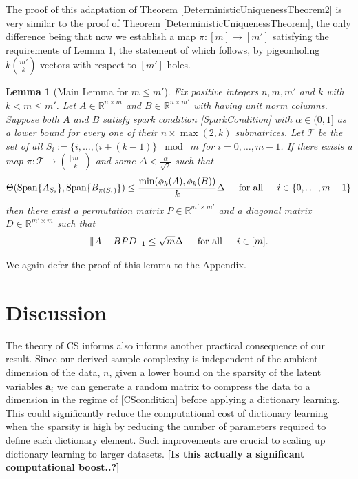 \documentclass[journal, onecolumn]{IEEEtran}
\newtheorem{lemma}{Lemma}
\begin{document}
The proof of this adaptation of Theorem \ref{DeterministicUniquenessTheorem2} is very similar to the proof of Theorem \ref{DeterministicUniquenessTheorem}, the only difference being that now we establish a map $\pi: [m] \to [m']$ satisfying the requirements of Lemma \ref{MainLemma2}, the statement of which follows, by pigeonholing $k{m' \choose k}$ vectors with respect to $[m']$ holes.

\begin{lemma}[Main Lemma for $m \leq m'$]\label{MainLemma2}
Fix positive integers $n, m, m'$ and $k$ with $k < m \leq m'$. Let $A \in \mathbb{R}^{n \times m}$ and $B \in \mathbb{R}^{n \times m'}$ with having unit norm columns. Suppose both $A$ and $B$ satisfy spark condition \eqref{SparkCondition} with $\alpha \in (0,1]$ as a lower bound for every one of their $n \times \max(2,k)$ submatrices. Let $\mathcal{T}$ be the set of all $S_i := \{i, \ldots, (i + (k-1) \} \;\bmod\; m$ for $i = 0, \ldots, m-1$. If there exists a map $\pi: \mathcal{T} \to {[m] \choose k}$ and some $\Delta < \frac{\alpha}{\sqrt{2}}$ such that 
\begin{equation}\label{GapUpperBound2}
\Theta(\text{Span}\{A_{S_i}\}, \text{Span}\{B_{\pi(S_i)}\}) \leq \frac{ \min(\phi_k(A), \phi_k(B)) }{k} \Delta \indent \text{for all} \indent i \in \{0, \ldots, m-1\}
\end{equation}
%
then there exist a permutation matrix $P \in \mathbb{R}^{m' \times m'}$ and a diagonal matrix $D \in \mathbb{R}^{m' \times m}$ such that
\begin{align}
\|A - BPD\|_1 \leq \sqrt{m}\Delta \indent \text{for all} \indent i \in [m].
\end{align}
\end{lemma}

We again defer the proof of this lemma to the Appendix.


\section{Discussion}

The theory of CS informs also informs another practical consequence of our result. Since our derived sample complexity is independent of the ambient dimension of the data, $n$, given a lower bound on the sparsity of the latent variables $\mathbf{a}_i$ we can generate a random matrix to compress the data to a dimension in the regime of \eqref{CScondition} before applying a dictionary learning. This could significantly reduce the computational cost of dictionary learning when the sparsity is high by reducing the number of parameters required to define each dictionary element. Such improvements are crucial to scaling up dictionary learning to larger datasets. \textbf{[Is this actually a significant computational boost..?]}
\end{document}

